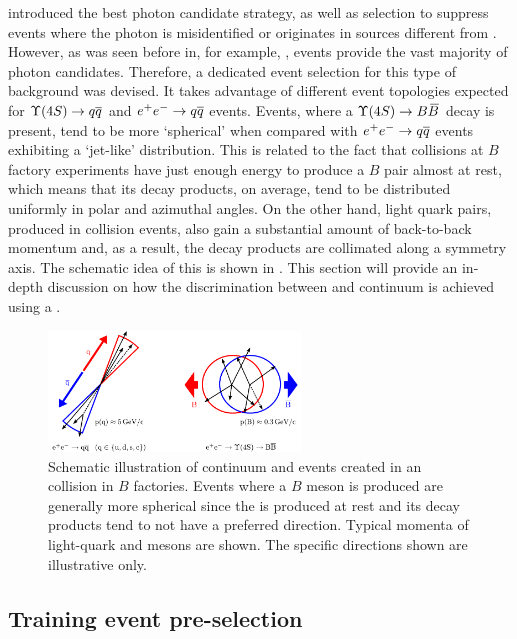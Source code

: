  introduced the best photon candidate strategy, 
as well as selection to suppress events 
where the photon is misidentified or originates in sources different from \BtoXsgamma.
However, as was seen before in, for example, ,
\epem\ra\qqbar events provide the vast majority of photon candidates.
Therefore, a dedicated event selection for this type of background was devised.
It takes advantage of different event topologies expected for $\FourS\to\qqbar$ and $e^+e^-\rightarrow q\overline q$ events.
Events, where a $\FourS\to\BB$ decay is present, tend to be more `spherical' when compared with $e^+e^-\rightarrow q\overline q$ events exhibiting a `jet-like' distribution.
This is related to the fact that \epem collisions at $B$ factory experiments have just enough energy to produce a $B$ pair almost at rest, which means that its decay products, on average, tend to be distributed uniformly in polar and azimuthal angles.
On the other hand, light quark pairs, produced in \epem collision events, also gain a substantial amount of back-to-back momentum and, as a result, the decay products are collimated along a symmetry axis. 
The schematic idea of this is shown in .
This section will provide an in-depth discussion on how the discrimination between \BtoXsgamma and continuum is achieved using a \BDT.

\begin{figure}[htbp!]
    \centering
    \includegraphics[width=0.6\textwidth]{figures/continuum_suppression/figure_continuum_suppression_event_shapes.pdf}
    \caption{\label{fig:continuum_schematic} Schematic illustration of continuum and \BB events created in an \epem collision in $B$ factories.
    Events where a $B$ meson is produced are generally more spherical since the \FourS is produced at rest and its decay products tend to not have a preferred direction.
    Typical momenta of light-quark and \BB mesons are shown.
    The specific directions shown are illustrative only. 
    }
\end{figure}

\subsection{Training event pre-selection}\label{sec:preselection}

